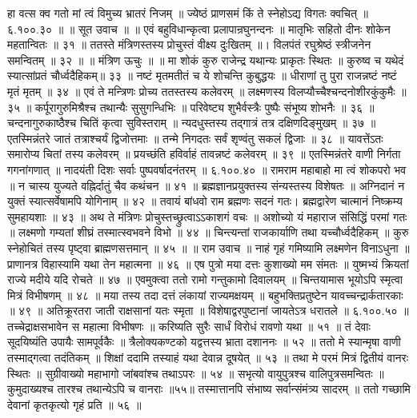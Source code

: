 हा वत्स क्व गतो मां त्वं विमुच्य भ्रातरं निजम् ॥
ज्येष्ठं प्राणसमं किं ते स्नेहोऽद्य विगतः क्वचित् ॥ ६.१००.३० ॥
॥ सूत उवाच ॥ ॥
एवं बहुविधान्कृत्वा प्रलापान्रघुनन्दनः ॥
मातृभिः सहितो दीनः शोकेन महतान्वितः ॥ ३१ ॥
ततस्ते मंत्रिणस्तस्य प्रोचुस्तं वीक्ष्य दुःखितम् ॥।
विलपंतं रघुश्रेष्ठं स्त्रीजनेन समन्वितम् ॥ ३२ ॥
॥ मंत्रिण ऊचुः ॥ ॥
मा शोकं कुरु राजेन्द्र यथान्यः प्राकृतः स्थितः ॥
कुरुष्व च यथेदं स्यात्सांप्रतं चौर्ध्वदैहिकम्॥ ३३ ॥
नष्टं मृतमतीतं च ये शोचन्ति कुबुद्धयः ॥
धीराणां तु पुरा राजन्नष्टं नष्टं मृतं मृतम् ॥ ३४ ॥
एवं ते मन्त्रिणः प्रोच्य ततस्तस्य कलेवरम् ॥
लक्ष्मणस्य विलप्यौच्चैश्चन्दनोशीरकुंकुमैः ॥ ३५ ॥
कर्पूरागुरुमिश्रैश्च तथान्यैः सुसुगन्धिभिः ॥
परिवेष्ट्य शुभैर्वस्त्रैः पुष्पैः संभूष्य शोभनैः ॥ ३६ ॥
चन्दनागुरुकाष्ठैश्च चितिं कृत्वा सुविस्तराम् ॥
न्यदधुस्तस्य तद्गात्रं तत्र दक्षिणदिङ्मुखम् ॥ ३७ ॥
एतस्मिन्नंतरे जातं तत्राश्चर्यं द्विजोत्तमाः ॥
तन्मे निगदतः सर्वं शृण्वंतु सकलं द्विजाः ॥ ३८ ॥
यावत्तेंऽतः समारोप्य चितां तस्य कलेवरम् ॥
प्रयच्छंति हविर्वाहं तावन्नष्टं कलेवरम् ॥ ३९ ॥
एतस्मिन्नंतरे वाणी निर्गता गगनांगणात् ॥
नादयंती दिशः सर्वाः पुष्पवर्षादनंतरम् ॥ ६.१००.४० ॥
रामराम महाबाहो मा त्वं शोकपरो भव ॥
न चास्य युज्यते वह्निर्दातुं चैव कथंचन ॥ ४१ ॥
ब्रह्मज्ञानप्रयुक्तस्य संन्यस्तस्य विशेषतः ॥
अग्निदानं न युक्तं स्यात्सर्वेषामपि योगिनाम् ॥ ४२ ॥
तवायं बांधवो राम ब्रह्मणः सदनं गतः।
ब्रह्मद्वारेण चात्मानं निष्क्रम्य सुमहायशाः ॥ ४३ ॥
अथ ते मंत्रिणः प्रोचुस्तच्छ्रुत्वाऽऽकाशगं वचः ॥
अशोच्यो यं महाराज संसिद्धिं परमां गतः ॥
लक्ष्मणो गम्यतां शीघ्रं तस्मात्स्वभवने विभो ॥ ४४ ॥
चिन्त्यन्तां राजकार्याणि तथा यच्चौर्ध्वदैहिकम् ॥
कुरु स्नेहोचितं तस्य पृष्ट्वा ब्राह्मणसत्तमान् ॥ ४५ ॥
॥ राम उवाच ॥
नाहं गृहं गमिष्यामि लक्ष्मणेन विनाऽधुना ॥
प्राणानत्र विहास्यामि यथा तेन महात्मना ॥ ४६ ॥
एष पुत्रो मया दत्तः कुशाख्यो मम संमतः ॥
युष्मभ्यं क्रियतां राज्ये मदीये यदि रोचते ॥ ४७ ॥
एवमुक्त्वा ततो रामो गन्तुकामो दिवालयम् ॥
चिन्तयामास भूयोऽपि स्मृत्वा मित्रं विभीषणम् ॥ ४८ ॥
मया तस्य तदा दत्तं लंकायां राज्यमक्षयम् ॥
बहुभक्तिप्रतुष्टेन यावच्चन्द्रार्कतारकाः ॥ ४९ ॥
अतिक्रूरतरा जाती राक्षसानां यतः स्मृता ॥
विशेषाद्वरपुष्टानां जायतेऽत्र धरातले ॥ ६.१००.५० ॥
तच्चेद्राक्षसभावेन स महात्मा विभीषणः ॥
करिष्यति सुरैः सार्धं विरोधं रावणो यथा ॥ ५१ ॥
तं देवाः सूदयिष्यंति उपायैः सामपूर्वकैः ॥
त्रैलोक्यकण्टको यद्वत्तस्य भ्राता दशाननः ॥ ५२ ॥
ततो मे स्यान्मृषा वाणी तस्माद्गत्वा तदंतिकम् ॥
शिक्षां ददामि तस्याहं यथा देवान्न दूषयेत् ॥ ५३ ॥
तथा मे परमं मित्रं द्वितीयं वानरः स्थितः ॥
सुग्रीवाख्यो महाभागो जांबवांश्च तथाऽपरः ॥ ५४ ॥
सभृत्यो वायुपुत्रश्च वालिपुत्रसमन्वितः ॥
कुमुदाख्यश्च तारश्च तथान्येऽपि च वानराः ॥५५॥
तस्मात्तानपि संभाष्य सर्वान्संमंत्र्य सादरम् ॥
ततो गच्छामि देवानां कृतकृत्यो गृहं प्रति ॥ ५६ ॥
